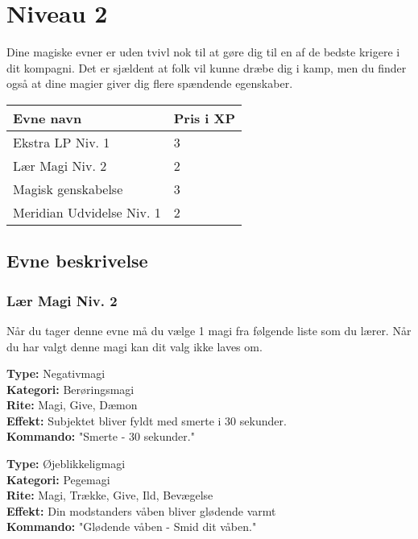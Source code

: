 \chapter{Niveau 2}
Dine magiske evner er uden tvivl nok til at gøre dig til en af de bedste krigere i dit kompagni. Det er sjældent at folk vil kunne dræbe dig i kamp, men du finder også at dine magier giver dig flere spændende egenskaber.
\begin{table}[H]
    \centering
    \begin{tabular}{|p{}|p{}|}
    \rowcolor{cerulean!80}\hline
    Evne navn & Pris i XP \\\hline
       Ekstra LP Niv. 1 & 3 \\\hline
       Lær Magi Niv. 2 & 2 \\\hline
       Magisk genskabelse & 3 \\\hline
       Meridian Udvidelse Niv. 1 & 2 \\\hline
    \end{tabular}
\end{table}
\section{Evne beskrivelse}



\subsection{Lær Magi Niv. 2}
Når du tager denne evne må du vælge 1 magi fra følgende liste som du lærer. Når du har valgt denne magi kan dit valg ikke laves om.

\begin{lærmagi*}[Smerte]
\textbf{Type:} Negativmagi\\
\textbf{Kategori:} Berøringsmagi\\
\textbf{Rite:} Magi, Give, Dæmon\\
\textbf{Effekt:} Subjektet bliver fyldt med smerte i 30 sekunder.\\
\textbf{Kommando:} "Smerte - 30 sekunder."\\
\end{lærmagi*}

\begin{lærmagi*}
\textbf{Type:} Øjeblikkeligmagi\\
\textbf{Kategori:} Pegemagi\\
\textbf{Rite:} Magi, Trække, Give, Ild, Bevægelse\\
\textbf{Effekt:} Din modstanders våben bliver glødende varmt\\
\textbf{Kommando:} "Glødende våben - Smid dit våben."\\
\end{lærmagi*}


